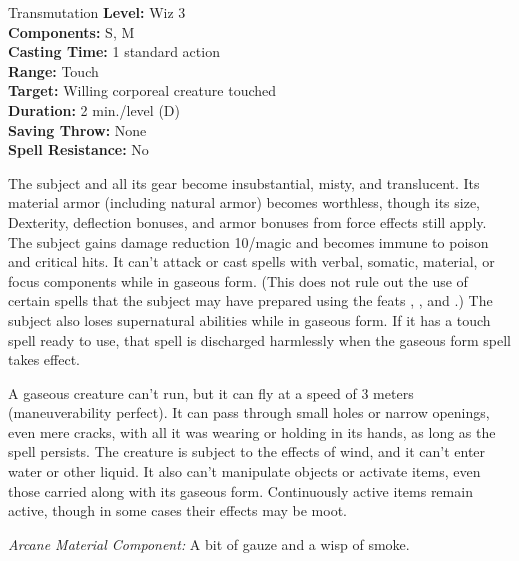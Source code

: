{Transmutation}
{
	\textbf{Level:}
	Wiz 3\\
	\textbf{Components:}
	S, M\\
	\textbf{Casting Time:}
	1 standard action\\
	\textbf{Range:}
	Touch\\
	\textbf{Target:}
	Willing corporeal creature touched\\
	\textbf{Duration:}
	2 min./level (D)\\
	\textbf{Saving Throw:}
	None\\
	\textbf{Spell Resistance:}
	No\\
}
{
	The subject and all its gear become insubstantial, misty, and translucent. Its material armor (including natural armor) becomes worthless, though its size, Dexterity, deflection bonuses, and armor bonuses from force effects still apply. The subject gains damage reduction 10/magic and becomes immune to poison and critical hits. It can't attack or cast spells with verbal, somatic, material, or focus components while in gaseous form. (This does not rule out the use of certain spells that the subject may have prepared using the feats , , and .) The subject also loses supernatural abilities while in gaseous form. If it has a touch spell ready to use, that spell is discharged harmlessly when the gaseous form spell takes effect.

	A gaseous creature can't run, but it can fly at a speed of 3 meters (maneuverability perfect). It can pass through small holes or narrow openings, even mere cracks, with all it was wearing or holding in its hands, as long as the spell persists. The creature is subject to the effects of wind, and it can't enter water or other liquid. It also can't manipulate objects or activate items, even those carried along with its gaseous form. Continuously active items remain active, though in some cases their effects may be moot.

	\textit{Arcane Material Component:}
	A bit of gauze and a wisp of smoke.

}
